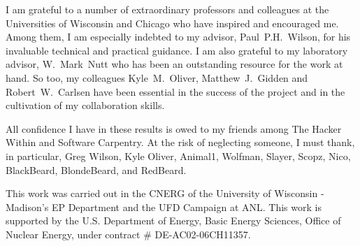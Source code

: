 I am grateful to a number of extraordinary professors and colleagues at the 
Universities of Wisconsin and Chicago who have inspired and encouraged me. 
Among  them, I am especially indebted to my advisor, Paul~P.H.~Wilson, for his 
invaluable technical and practical guidance. I am also grateful to my 
laboratory advisor, W.~Mark~Nutt who has been an outstanding resource for the 
work at hand. So too, my colleagues Kyle~M.~Oliver, Matthew~J.~Gidden and 
Robert~W.~Carlsen have been essential in the success of the \Cyclus project and 
in the cultivation of my collaboration skills.

All confidence I have in these results is owed to my friends among The Hacker 
Within and Software Carpentry. At the risk of neglecting someone, I must thank, 
in particular, Greg Wilson, Kyle Oliver, Animal1, Wolfman, Slayer, Scopz, Nico,  
BlackBeard, BlondeBeard, and RedBeard.

This work was carried out in the \gls{CNERG} of the University of Wisconsin - 
Madison's \gls{EP} Department and the \gls{UFD} Campaign at \gls{ANL}. This 
work is supported by the U.S. Department of Energy, Basic Energy Sciences, 
Office of Nuclear Energy, under contract \# DE-AC02-06CH11357.
